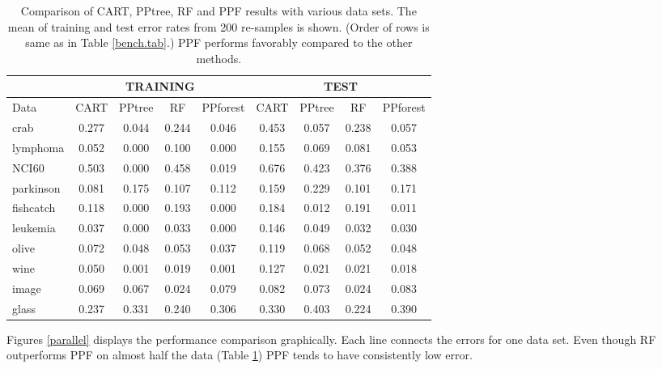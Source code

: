 \documentclass[12pt]{article}\usepackage[]{graphicx}\usepackage[]{color}
\begin{document}
\begin{table}[ht]
\centering
\caption{Comparison of  CART, PPtree, RF and PPF results with various data sets. The mean of training and test error rates from 200 re-samples is shown. (Order of rows is same as in Table \ref{bench.tab}.) PPF performs favorably compared to the other methods. \label{res}} 
\begin{tabular}{l||cccc||cccc}
  \hline\hline &  \multicolumn{4}{c||}{TRAINING} & \multicolumn{4}{c}{TEST} \\ \hline
Data & CART & PPtree & RF & PPforest & CART & PPtree & RF & PPforest \\ 
  \hline
crab & 0.277 & 0.044 & 0.244 & 0.046 & 0.453 & 0.057 & 0.238 & 0.057 \\ 
  lymphoma & 0.052 & 0.000 & 0.100 & 0.000 & 0.155 & 0.069 & 0.081 & 0.053 \\ 
  NCI60 & 0.503 & 0.000 & 0.458 & 0.019 & 0.676 & 0.423 & 0.376 & 0.388 \\ 
  parkinson & 0.081 & 0.175 & 0.107 & 0.112 & 0.159 & 0.229 & 0.101 & 0.171 \\ 
  fishcatch & 0.118 & 0.000 & 0.193 & 0.000 & 0.184 & 0.012 & 0.191 & 0.011 \\ 
  leukemia & 0.037 & 0.000 & 0.033 & 0.000 & 0.146 & 0.049 & 0.032 & 0.030 \\ 
  olive & 0.072 & 0.048 & 0.053 & 0.037 & 0.119 & 0.068 & 0.052 & 0.048 \\ 
  wine & 0.050 & 0.001 & 0.019 & 0.001 & 0.127 & 0.021 & 0.021 & 0.018 \\ 
  image & 0.069 & 0.067 & 0.024 & 0.079 & 0.082 & 0.073 & 0.024 & 0.083 \\ 
  glass & 0.237 & 0.331 & 0.240 & 0.306 & 0.330 & 0.403 & 0.224 & 0.390 \\ 
   \hline
\end{tabular}
\end{table}


Figures \ref{parallel} displays the performance comparison graphically. Each line connects the errors for one data set. Even though RF outperforms PPF on almost half the data (Table \ref{res}) PPF tends to have consistently low error.
\end{document}
